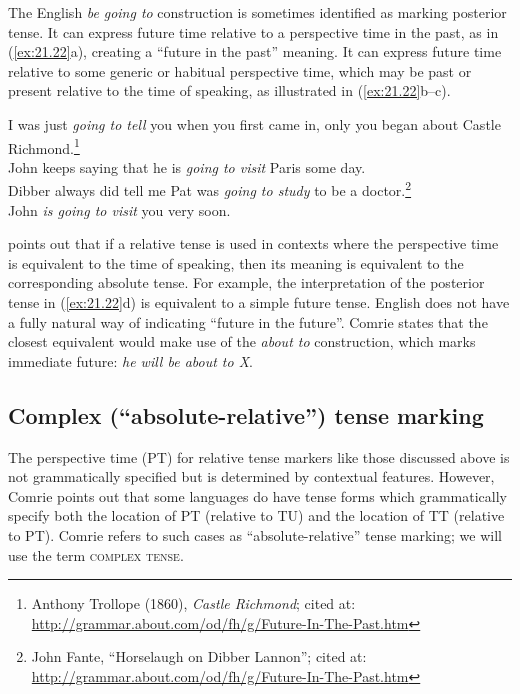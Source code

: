 \z


The English \textit{be} \textit{going to} construction is sometimes identified as marking posterior tense. It can express future time relative to a perspective time in the past, as in (\ref{ex:21.22}a), creating a “future in the past” meaning. It can express future time relative to some generic or habitual perspective time, which may be past or present relative to the time of speaking, as illustrated in (\ref{ex:21.22}b--c).


\ea \label{ex:21.22}
\ea  I was just \textit{going to tell} you when you first came in, only you began about Castle Richmond.\footnote{Anthony  Trollope (1860), \textit{Castle Richmond}; cited at: \url{http://grammar.about.com/od/fh/g/Future-In-The-Past.htm}} \\
\ex John keeps saying that he is \textit{going to visit} Paris some day.\\
\ex Dibber always did tell me Pat was \textit{going to study} to be a doctor.\footnote{John Fante, “Horselaugh on Dibber Lannon”; cited at: \url{http://grammar.about.com/od/fh/g/Future-In-The-Past.htm}} \\
\ex John \textit{is going to visit} you very soon.
                       \z
\z


\citet{Comrie1985} points out that if a relative tense is used in contexts where the perspective time is equivalent to the time of speaking, then its meaning is equivalent to the corresponding absolute tense. For example, the interpretation of the posterior tense in (\ref{ex:21.22}d) is equivalent to a simple future tense. English does not have a fully natural way of indicating “future in the future”. Comrie states that the closest equivalent would make use of the \textit{about to} construction, which marks immediate future: \textit{he will be about to X}. 


\subsection{Complex (“absolute-relative”) tense marking}\label{sec:21.4.1}

The perspective time (PT) for relative tense markers like those discussed above is not grammatically specified but is determined by contextual features. However, Comrie points out that some languages do have tense forms which grammatically specify both the location of PT (relative to TU) and the location of TT (relative to PT). Comrie refers to such cases as “absolute-relative” tense marking; we will use the term \textsc{complex tense}.



